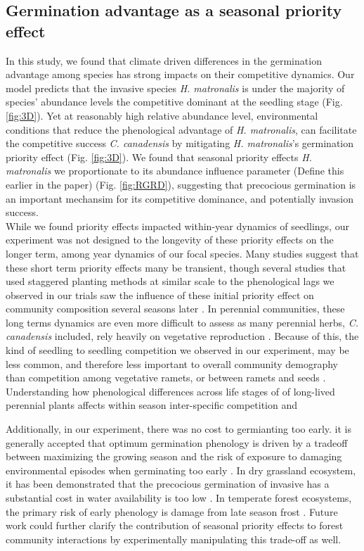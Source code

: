 \documentclass{article}\usepackage[]{graphicx}\usepackage[]{color}
\begin{document}
{\subsection*{Germination advantage as a seasonal priority effect} 
In this study, we found that climate driven differences in the germination advantage among species has strong impacts on their competitive dynamics. Our model predicts that the invasive species \textit{H. matronalis} is under the majority of species' abundance levels the competitive dominant at the seedling stage (Fig. \ref{fig:3D}). Yet at reasonably high relative abundance level, environmental conditions that reduce the phenological advantage of \textit{H. matronalis}, can facilitate the competitive success \textit{C. canadensis} by mitigating \textit{H. matronalis}'s germination priority effect (Fig. \ref{fig:3D}). We found that seasonal priority effects \textit{H. matronalis} we proportionate to its abundance influence parameter (Define this earlier in the paper) (Fig. \ref{fig:RGRD}), suggesting that precocious germination is an important mechansim for its competitive dominance, and potentially invasion success.\\

While we found priority effects impacted within-year dynamics of seedlings, our experiment was not designed to the longevity of these priority effects on the longer term, among year dynamics of our focal species. Many studies suggest that these short term priority effects many be transient, though several studies that used staggered planting methods at similar scale to the phenological lags we observed in our trials saw the influence of these initial priority effect on community composition several seasons later \citep{}.  In perennial communities, these long terms dynamics are even more difficult to assess as many perennial herbs, \textit{C. canadensis} included, rely heavily on vegetative reproduction \citep{}. Because of this, the kind of seedling to seedling competition we observed in our experiment, may be less common, and therefore less important to overall community demography than competition among vegetative ramets, or between ramets and seeds \citep{}. Understanding how phenological differences across life stages of of long-lived perennial plants affects within season inter-specific competition and 

Additionally, in our experiment, there was no cost to germianting too early. it is generally accepted that optimum germination phenology is driven by a tradeoff between maximizing the growing season and the risk of exposure to damaging environmental episodes when germinating too early \citep{}. In dry grassland ecosystem, it has been demonstrated that the precocious germination of invasive has a substantial cost in water availability is too low \citep{}. In temperate forest ecosystems, the primary risk of early phenology is damage from late season frost \citep{}. Future work could further clarify the contribution of seasonal priority effects to forest community interactions by experimentally manipulating this trade-off as well.

}
\end{document}
